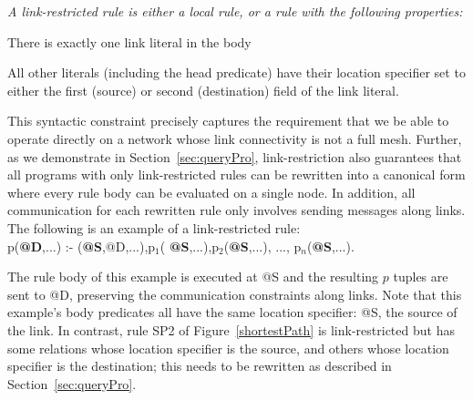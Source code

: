 \begin{Def}\label{def:topRestricted} {\em A {\em link-restricted} rule
    is either a local rule, or a rule with the following properties:
\begin{mylist}
\item There is exactly one link literal in the body
\item All other literals (including the
      head predicate) have their
  location specifier set to either the first (source) or second
  (destination) field of the link literal. 
\end{mylist}}
\end{Def}

This syntactic constraint precisely captures the requirement that we
be able to operate
directly on a network whose link connectivity is not a full mesh.
Further, as we demonstrate in Section~\ref{sec:queryPro}, link-restriction
also guarantees that all programs with only link-restricted
rules can be rewritten into a canonical form where every rule body can be
evaluated on a single node. In addition, all communication for each
rewritten rule only involves sending messages along links. The
following is an example of a link-restricted rule:\\
\vspace{2pt}
{\small 
\noindent p({\bf @D},...) :- \link({\bf @S},@D,...),p$_{1}$({\bf
  @S},...),p$_{2}$({\bf @S},...), ..., p$_{n}$({\bf @S},...).
}
\vspace{2pt}

The rule body of this example is executed at @S and the resulting $p$
tuples are sent to @D, preserving the communication constraints along
links. Note that this example's body predicates all have the same
location specifier: @S, the source of the link. In contrast, rule SP2
of Figure~\ref{shortestPath} is link-restricted but has some relations whose location
specifier is the source, and others whose location specifier is the
destination; this needs to be rewritten as described in Section~\ref{sec:queryPro}. 



